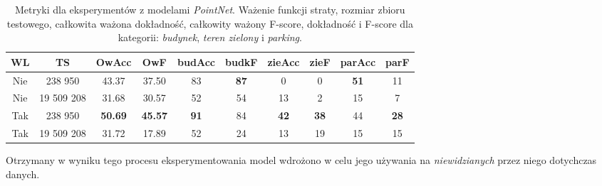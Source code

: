 \begin{table}[!h]
    \centering
    \begin{tabular}{|c|c|c|c|c|c|c|c|c|c|}
    \hline
    WL & TS & OwAcc & OwF & budAcc & budkF & zieAcc & zieF & parAcc & parF \\
    \hline 
    Nie & 238 950 & 43.37 & 37.50 & 83 & \textbf{87} & 0 & 0 & \textbf{51} & 11 \\
    \hline 
    Nie & 19 509 208 & 31.68 & 30.57 & 52 & 54 & 13 & 2 & 15 & 7 \\
    \hline 
    Tak & 238 950 & \textbf{50.69} & \textbf{45.57} & \textbf{91} & 84 & \textbf{42} & \textbf{38} & 44 & \textbf{28} \\
    \hline
    Tak & 19 509 208 & 31.72 & 17.89 & 52 & 24 & 13 & 19 & 15 & 15 \\
    \hline
    \end{tabular}
\caption{Metryki dla eksperymentów z modelami \textit{PointNet}. Ważenie funkcji straty, rozmiar zbioru testowego, całkowita ważona dokładność, całkowity ważony F-score, dokładność i F-score dla kategorii: \textit{budynek}, \textit{teren zielony} i \textit{parking}.}
\label{table:tab_seg_met}
\end{table}

Otrzymany w wyniku tego procesu eksperymentowania model wdrożono w celu jego używania na \textit{niewidzianych} przez niego dotychczas danych.